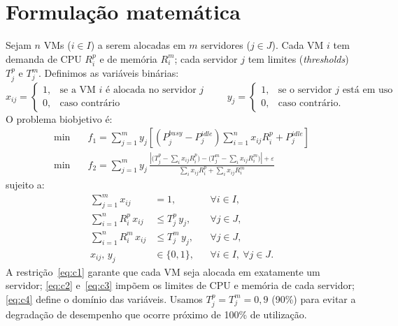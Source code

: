 \documentclass[11pt]{article}
\begin{document}
\section{Formulação matemática}
Sejam $n$ VMs ($i\in I$) a serem alocadas em $m$ servidores ($j\in J$). Cada VM
$i$ tem demanda de CPU $R^{p}_{i}$ e de memória $R^{m}_{i}$; cada servidor $j$ tem
limites (\emph{thresholds}) $T^{p}_{j}$ e $T^{m}_{j}$. Definimos as variáveis
binárias:
\[
  x_{ij}=\begin{cases}1,&\text{se a VM }i\text{ é alocada no servidor }j\\0,&\text{caso contrário}\end{cases}
  \qquad
  y_{j}=\begin{cases}1,&\text{se o servidor }j\text{ está em uso}\\0,&\text{caso contrário.}\end{cases}
\]
O problema biobjetivo é:
\begin{align}
  \min \quad & f_{1}=\sum_{j=1}^{m} y_{j}\!\left[(P^{busy}_{j}-P^{idle}_{j})\sum_{i=1}^{n} x_{ij}R^{p}_{i} + P^{idle}_{j}\right] \label{eq:f1}\\[2pt]
  \min \quad & f_{2}=\sum_{j=1}^{m} y_{j}\,
     \frac{\left\lvert\bigl(T^{p}_{j}-\sum_{i} x_{ij}R^{p}_{i}\bigr)-\bigl(T^{m}_{j}-\sum_{i} x_{ij}R^{m}_{i}\bigr)\right\rvert+\varepsilon}
          {\sum_{i} x_{ij}R^{p}_{i}+\sum_{i} x_{ij}R^{m}_{i}} \label{eq:f2}
\end{align}
sujeito a:
\begin{align}
  \sum_{j=1}^{m} x_{ij} &= 1, & &\forall i\in I, \label{eq:c1}\\
  \sum_{i=1}^{n} R^{p}_{i}\,x_{ij} &\le T^{p}_{j}\,y_{j}, & &\forall j\in J, \label{eq:c2}\\
  \sum_{i=1}^{n} R^{m}_{i}\,x_{ij} &\le T^{m}_{j}\,y_{j}, & &\forall j\in J, \label{eq:c3}\\
  x_{ij},\,y_{j} &\in \{0,1\}, & &\forall i\in I,\ \forall j\in J. \label{eq:c4}
\end{align}
A restrição~\eqref{eq:c1} garante que cada VM seja alocada em exatamente um
servidor; \eqref{eq:c2} e~\eqref{eq:c3} impõem os limites de CPU e memória de cada
servidor; \eqref{eq:c4} define o domínio das variáveis. Usamos
$T^{p}_{j}=T^{m}_{j}=0{,}9$ (90\%) para evitar a degradação de desempenho que
ocorre próximo de 100\% de utilização.

\end{document}

